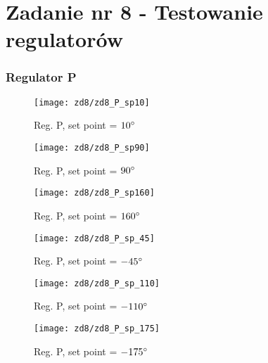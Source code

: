 \documentclass[11 pt]{article}
\begin{document}
\newpage

\setcounter{section}{8}
\setcounter{figure}{0}
\section*{Zadanie nr 8 - Testowanie regulatorów}

\vspace{-0.25 cm}

\subsubsection*{Regulator P}

\renewcommand{\w}{0.7}

\begin{figure}[h!]
	\centerline{
	\texttt{[image: zd8/zd8\_P\_sp10]}
	}
	\caption{Reg. P, set point = $10 \degree$}
\end{figure}

\begin{figure}[h!]
	\centerline{
	\texttt{[image: zd8/zd8\_P\_sp90]}
	}
	\caption{Reg. P, set point = $90 \degree$}
\end{figure}

\begin{figure}[h!]
	\centerline{
	\texttt{[image: zd8/zd8\_P\_sp160]}
	}
	\caption{Reg. P, set point = $160 \degree$}
\end{figure}

\newpage

\renewcommand{\w}{0.73}

\begin{figure}[h!]
	\centerline{
	\texttt{[image: zd8/zd8\_P\_sp\_45]}
	}
	\caption{Reg. P, set point = $-45 \degree$}
\end{figure}

\begin{figure}[h!]
	\centerline{
	\texttt{[image: zd8/zd8\_P\_sp\_110]}
	}
	\caption{Reg. P, set point = $-110 \degree$}
\end{figure}

\begin{figure}[h!]
	\centerline{
	\texttt{[image: zd8/zd8\_P\_sp\_175]}
	}
	\caption{Reg. P, set point = $-175 \degree$}
\end{figure}

\newpage
\end{document}
